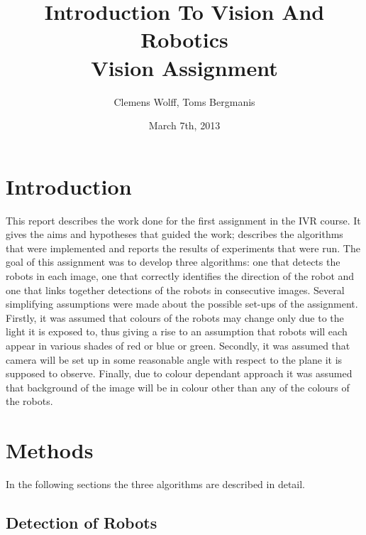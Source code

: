 \documentclass[10pt,a4paper,twocolumn]{article}
\title{Introduction To Vision And Robotics \\ Vision Assignment}
\author{Clemens Wolff, Toms Bergmanis}
\date{March 7th, 2013}
\begin{document}
\maketitle

\section{Introduction}
This report describes the work done for the first assignment in the IVR course. 
It gives the aims and hypotheses that guided the work; describes the algorithms 
that were implemented and reports the results of experiments that were run.
The goal of this assignment was to develop three algorithms: one that detects 
the robots in each image, one that correctly identifies the direction of the 
robot and one that links together detections of the robots in consecutive 
images. 
Several simplifying assumptions were made about the possible set-ups of the 
assignment.  Firstly, it was assumed that colours of the robots may change only 
due to the light it is exposed to, thus giving a rise to an assumption that 
robots will each appear in various shades of red or blue or green. Secondly, it 
was assumed that camera will be set up in some reasonable angle with respect to 
the plane it is supposed to observe. Finally, due to colour dependant approach 
it was assumed that background of the image will be in colour other than any of 
the colours of the robots.


\section{Methods}
In the following sections the three algorithms are described in detail. 

\subsection{Detection of Robots}
\end{document}
